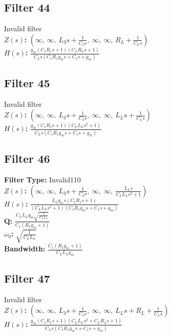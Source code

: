 \documentclass{article}
\begin{document}
\subsection*{Filter 44}
Invalid filter \\ 
\textbf{$Z(s)$:} $\left( \infty, \  \infty, \  L_{3} s + \frac{1}{C_{3} s}, \  \infty, \  \infty, \  R_{L} + \frac{1}{C_{L} s}\right)$ \\ 
\textbf{$H(s)$:} $\frac{g_{m} \left(C_{1} R_{1} s + 1\right) \left(C_{L} R_{L} s + 1\right)}{C_{L} s \left(C_{1} R_{1} g_{m} s + C_{1} s + g_{m}\right)}$ \\ 
\subsection*{Filter 45}
Invalid filter \\ 
\textbf{$Z(s)$:} $\left( \infty, \  \infty, \  L_{3} s + \frac{1}{C_{3} s}, \  \infty, \  \infty, \  L_{L} s + \frac{1}{C_{L} s}\right)$ \\ 
\textbf{$H(s)$:} $\frac{g_{m} \left(C_{1} R_{1} s + 1\right) \left(C_{L} L_{L} s^{2} + 1\right)}{C_{L} s \left(C_{1} R_{1} g_{m} s + C_{1} s + g_{m}\right)}$ \\ 
\subsection*{Filter 46}
\textbf{Filter Type:} Invalid110 \\ 
\textbf{$Z(s)$:} $\left( \infty, \  \infty, \  L_{3} s + \frac{1}{C_{3} s}, \  \infty, \  \infty, \  \frac{L_{L} s}{C_{L} L_{L} s^{2} + 1}\right)$ \\ 
\textbf{$H(s)$:} $\frac{L_{L} g_{m} s \left(C_{1} R_{1} s + 1\right)}{\left(C_{L} L_{L} s^{2} + 1\right) \left(C_{1} R_{1} g_{m} s + C_{1} s + g_{m}\right)}$ \\ 
\textbf{Q:} $\frac{C_{L} L_{L} g_{m} \sqrt{\frac{1}{C_{L} L_{L}}}}{C_{1} \left(R_{1} g_{m} + 1\right)}$ \\ 
\textbf{$\omega_0$:} $\sqrt{\frac{1}{C_{L} L_{L}}}$ \\ 
\textbf{Bandwidth:} $\frac{C_{1} \left(R_{1} g_{m} + 1\right)}{C_{L} L_{L} g_{m}}$ \\ 
\subsection*{Filter 47}
Invalid filter \\ 
\textbf{$Z(s)$:} $\left( \infty, \  \infty, \  L_{3} s + \frac{1}{C_{3} s}, \  \infty, \  \infty, \  L_{L} s + R_{L} + \frac{1}{C_{L} s}\right)$ \\ 
\textbf{$H(s)$:} $\frac{g_{m} \left(C_{1} R_{1} s + 1\right) \left(C_{L} L_{L} s^{2} + C_{L} R_{L} s + 1\right)}{C_{L} s \left(C_{1} R_{1} g_{m} s + C_{1} s + g_{m}\right)}$ \\ 
\end{document}
